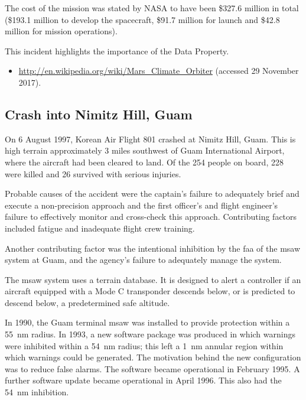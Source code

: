 The cost of the mission was stated by NASA to have been \$327.6 million in total (\$193.1 million to develop the spacecraft, \$91.7 million for launch and \$42.8 million for mission operations). 

This incident highlights the importance of the  Data Property.

\begin{itemize}
  \item \raggedright{\href{http://en.wikipedia.org/wiki/Mars_Climate_Orbiter}{http://en.wikipedia.org/wiki/Mars\_Climate\_Orbiter} (accessed 29 November 2017).}
\end{itemize}


\subsection{Crash into Nimitz Hill, Guam} \label{bkm:incacc:nimitzhill}
On 6 August 1997, Korean Air Flight 801 crashed at Nimitz Hill, Guam. This is high terrain approximately 3 miles southwest of Guam International Airport, where the aircraft had been cleared to land. Of the 254 people on board, 228 were killed and 26 survived with serious injuries.

Probable causes of the accident were the captain's failure to adequately brief and execute a non-precision approach and the first officer's and flight engineer's failure to effectively monitor and cross-check this approach. Contributing factors included fatigue and inadequate flight crew training.

Another contributing factor was the intentional inhibition by the \gls{faa} of the \gls{msaw} system at Guam, and the agency's failure to adequately manage the system.

The \gls{msaw} system uses a terrain database. It is designed to alert a controller if an aircraft equipped with a Mode C transponder descends below, or is predicted to descend below, a predetermined safe altitude.

In 1990, the Guam terminal \gls{msaw} was installed to provide protection within a 55~nm radius. In 1993, a new software package was produced in which warnings were inhibited within a 54~nm radius; this left a 1~nm annular region within which warnings could be generated. The motivation behind the new configuration was to reduce false alarms. The software became operational in February 1995. A further software update became operational in April 1996. This also had the 54~nm inhibition.

